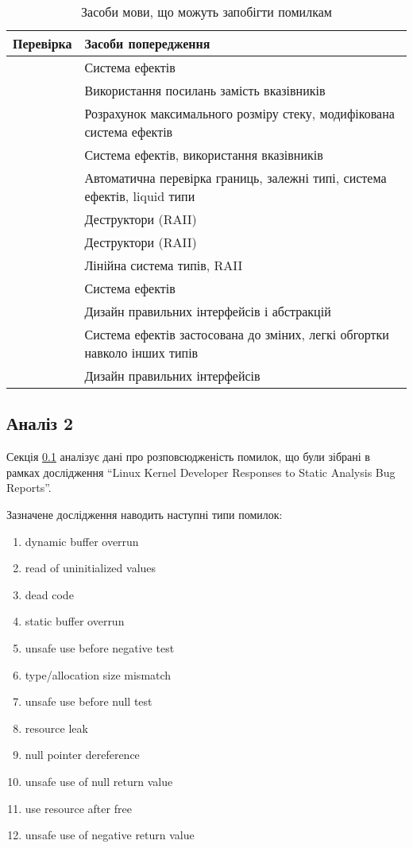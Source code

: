 \documentclass[main.tex]{subfiles}
\begin{document}
\begin{table}
  \tabulinesep=1mm
  \begin{tabu}{|c|X[l]|}
    \hline
    Перевірка & Засоби попередження \\
    \hline
     & Система ефектів \\
     & Використання посилань замість вказівників \\
     & Розрахунок максимального розміру стеку, модифікована система ефектів \\
    \hline
     & Система ефектів, використання вказівників \\
     & Автоматична перевірка границь, залежні типі, система ефектів, liquid типи \\
     & Деструктори (RAII) \\
     & Деструктори (RAII) \\
     & Лінійна система типів, RAII \\
    \hline
     & Система ефектів \\
     & Дизайн правильних інтерфейсів і абстракцій \\
     & Система ефектів застосована до зміних, легкі обгортки навколо інших типів \\
     & Дизайн правильних інтерфейсів \\
    \hline
  \end{tabu}
  \caption{Засоби мови, що можуть запобігти помилкам}
  \label{linux-errors-mitigation}
\end{table}

\FloatBarrier
\subsection{Аналіз 2}\label{linux-kernel-developer-responses-section}
Секція \ref{linux-kernel-developer-responses-section} аналізує дані про розповсюдженість помилок, що були зібрані в рамках дослідження ``Linux Kernel Developer Responses to Static Analysis Bug Reports''\cite{linux-kernel-developer-responses}.

Зазначене дослідження наводить наступні типи помилок:
\begin{enumerate}[nosep]
\item dynamic buffer overrun
\item read of uninitialized values
\item dead code
\item static buffer overrun
\item unsafe use before negative test
\item type/allocation size mismatch
\item unsafe use before null test
\item resource leak
\item null pointer dereference
\item unsafe use of null return value
\item use resource after free
\item unsafe use of negative return value
\end{enumerate}
\end{document}
